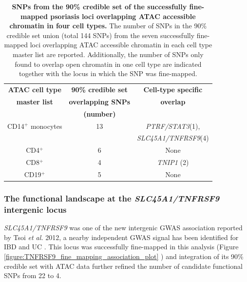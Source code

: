 \begin{table}[htbp]
\centering
\begin{tabular}{@{} c c c}
\toprule
\textbf{ATAC cell type} & \textbf{90\% credible set}   &  \textbf{Cell-type specific}  \\
\textbf{master list}    & \textbf{overlapping SNPs}    &   \textbf{overlap}   \\
									      &	\textbf{(number)}				     &                            \\
\midrule
\midrule
 CD14$^+$ monocytes    & 13                            &  \textit{PTRF/STAT3}(1),\\ 
                       &                               &  \textit{SLC45A1/TNFRSF9}(4)\\
 CD4$^+$              & 6                             &  None \\
 CD8$^+$              & 4                             &  \textit{TNIP1} (2)        \\
 CD19$^+$              & 5                            &  None     \\
\bottomrule
\end{tabular}
\medskip %
\caption[SNPs from the 90\% credible set of the successfully fine-mapped psoriasis loci overlapping ATAC accessible chromatin in four cell types.]{\textbf{SNPs from the 90\% credible set of the successfully fine-mapped psoriasis loci overlapping ATAC accessible chromatin in four cell types.} The number of SNPs in the 90\% credible set union (total 144 SNPs) from the seven successfully fine-mapped loci overlapping ATAC accessible chromatin in each cell type master list are reported. Additionally, the number of SNPs only found to overlap open chromatin in one cell type are indicated together with the locus in which the SNP was fine-mapped.}
\label{tab:Psoriasis_fine_mapping_ATAC_overlap}
\end{table}
 

\subsubsection{The functional landscape at the \textit{SLC45A1/TNFRSF9} intergenic locus}

\textit{SLC45A1/TNFRSF9} was one of the new intergenic GWAS association reported by Tsoi \textit{et al.} 2012, a nearby independent GWAS signal has been identified for IBD and UC \parencite{Jostins2012,Anderson2011}. This locus was successfully fine-mapped in this analysis (Figure \ref{figure:TNFRSF9_fine_mapping_association_plot} ) and integration of its 90\% credible set with ATAC data further refined the number of candidate functional SNPs from 22 to 4. 



